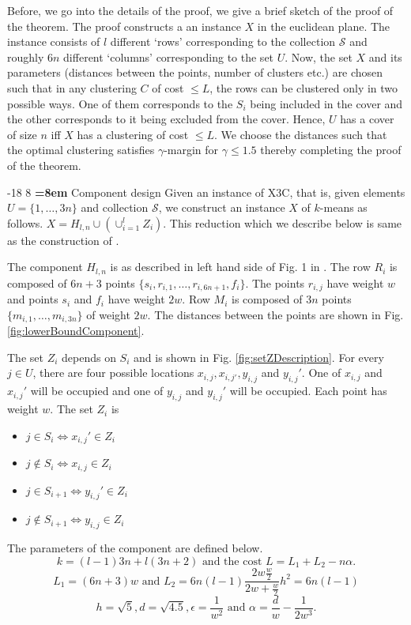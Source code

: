 \documentclass[orivec]{llncs}
\makeatletter
\newcommand{\mc}{\mathcal}
\renewcommand\subsubsection{\@startsection{subsubsection}{3}{\z@}%
   {-18\p@ \@plus -4\p@ \@minus -4\p@}%
   {8\p@ \@plus 4\p@ \@minus 4\p@}%
   {\normalfont\normalsize\bfseries\boldmath
   \rightskip=\z@ \@plus 8em \pretolerance=10000}}
\makeatother
\begin{document}
Before, we go into the details of the proof, we give a brief sketch of the proof of the theorem. The proof constructs a an instance $X$ in the euclidean plane. The instance consists of $l$ different `rows' corresponding to the collection $\mc S$ and roughly $6n$ different `columns' corresponding to the set $U$. Now, the set $X$ and its parameters (distances between the points, number of clusters etc.) are chosen such that in any clustering $C$ of cost $\le L$, the rows can be clustered only in two possible ways. One of them corresponds to the $S_i$ being included in the cover and the other corresponds to it being excluded from the cover. Hence, $U$ has a cover of size $n$ iff $X$ has a clustering of cost $\le L$. We choose the distances such that the optimal clustering satisfies $\gamma$-margin for $\gamma \le 1.5$ thereby completing the proof of the theorem. 
  
\subsubsection{Component design}
Given an instance of X3C, that is, given elements $U = \{1, \ldots, 3n\}$ and collection $\mc S$, we construct an instance $X$ of $k$-means as follows. $X = H_{l,n} \cup (\cup_{i=1}^l Z_i)$. This reduction which we describe below is same as the construction of \cite{vattani2009hardness}.

The component $H_{l,n}$ is as described in left hand side of Fig. 1 in \cite{vattani2009hardness}. The row $R_i$ is composed of $6n + 3$ points $\{s_i, r_{i, 1}, \ldots, r_{i, 6n+1}, f_i\}$. The points $r_{i, j}$ have weight $w$ and points $s_i$ and $f_i$ have weight $2w$. Row $M_i$ is composed of $3n$ points $\{m_{i,1}, \ldots, m_{i, 3n}\}$ of weight $2w$. The distances between the points are shown in Fig. \ref{fig:lowerBoundComponent}.

The set $Z_i$ depends on $S_i$ and is shown in Fig. \ref{fig:setZDescription}.  For every $j\in U$, there are four possible locations $x_{i, j}, x_{i,j'}, y_{i,j}$ and $y_{i, j}'$. One of $x_{i,j}$ and $x_{i,j}'$ will be occupied and one of $y_{i,j}$ and $y_{i,j}'$ will be occupied. Each point has weight $w$. The set $Z_i$ is
\begin{itemize}[nolistsep,noitemsep]
\item $j \in S_i \iff x_{i,j}' \in Z_i$
\item $j \not\in S_i \iff x_{i,j} \in Z_i$
\item $j \in S_{i+1} \iff y_{i,j}' \in Z_i$
\item $j \not\in S_{i+1} \iff y_{i,j} \in Z_i$

\end{itemize}
The parameters of the component are defined below. $$k = (l-1)3n + l(3n+2) \text{ and the cost }L = L_1 + L_2 -n\alpha.$$
$$L_1 = (6n+3)w \text{ and } L_2 = 6n(l-1)\frac{2w\frac{w}{2}}{2w+\frac{w}{2}}h^2 = 6n(l-1)$$
$$h = \sqrt{5}, d = \sqrt{4.5}, \epsilon = \frac{1}{w^2} \text{ and } \alpha = \frac{d}{w}-\frac{1}{2w^3}.$$
\end{document}
